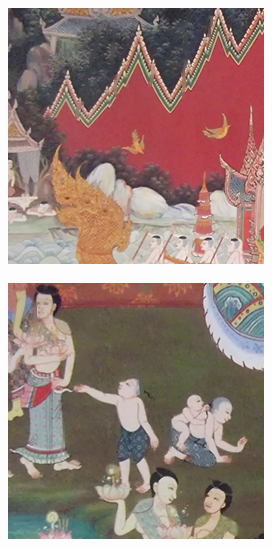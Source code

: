 \begin{figure}[H]
    \centering
    \begin{subfigure}{0.4\linewidth}
        \centering
        \includegraphics[width=0.8\linewidth]{image/result_ex4/splitbergman_case01.png}
    \end{subfigure}
    \begin{subfigure}{0.4\linewidth}
        \centering
        \includegraphics[width=0.8\linewidth]{image/result_ex4/splitbergman_case02.png}
    \end{subfigure}
    \begin{subfigure}{0.4\linewidth}

\end{subfigure}
\end{figure}
